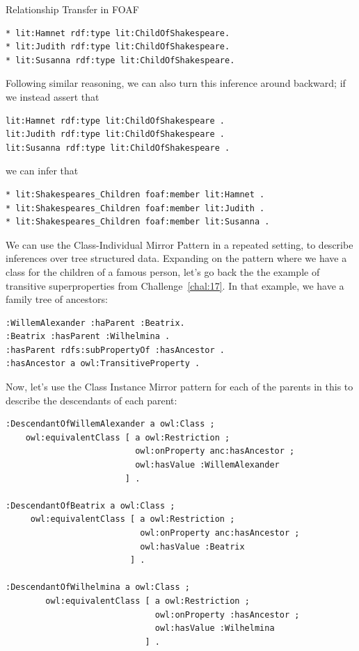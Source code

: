 \begin{challenge}{Relationship Transfer in FOAF}
\begin{lstlisting}
* lit:Hamnet rdf:type lit:ChildOfShakespeare.
* lit:Judith rdf:type lit:ChildOfShakespeare.
* lit:Susanna rdf:type lit:ChildOfShakespeare.
\end{lstlisting}

Following similar reasoning, we can also turn this inference around
backward; if we instead assert that

\begin{lstlisting}
lit:Hamnet rdf:type lit:ChildOfShakespeare .
lit:Judith rdf:type lit:ChildOfShakespeare .
lit:Susanna rdf:type lit:ChildOfShakespeare .
\end{lstlisting}

we can infer that

\begin{lstlisting}
* lit:Shakespeares_Children foaf:member lit:Hamnet .
* lit:Shakespeares_Children foaf:member lit:Judith .
* lit:Shakespeares_Children foaf:member lit:Susanna .
\end{lstlisting}

\end{challenge}



We can use the Class-Individual Mirror Pattern in a repeated setting, to 
describe inferences over tree structured data.  Expanding on the pattern 
where we have a class for the children of a famous person, let's go back 
the the example of transitive superproperties from Challenge~\ref{chal:17}.
In that example, we have a family tree of ancestors:

\begin{lstlisting}
:WillemAlexander :haParent :Beatrix.
:Beatrix :hasParent :Wilhelmina .
:hasParent rdfs:subPropertyOf :hasAncestor .
:hasAncestor a owl:TransitiveProperty . 
\end{lstlisting}

Now, let's use the Class Instance Mirror pattern for each of the parents in 
this to describe the descendants of each parent:

\begin{lstlisting}
:DescendantOfWillemAlexander a owl:Class ;
    owl:equivalentClass [ a owl:Restriction ;
                          owl:onProperty anc:hasAncestor ;
                          owl:hasValue :WillemAlexander
                        ] .

:DescendantOfBeatrix a owl:Class ;
     owl:equivalentClass [ a owl:Restriction ;
                           owl:onProperty anc:hasAncestor ;
                           owl:hasValue :Beatrix
                         ] .

:DescendantOfWilhelmina a owl:Class ;
        owl:equivalentClass [ a owl:Restriction ;
                              owl:onProperty :hasAncestor ;
                              owl:hasValue :Wilhelmina
                            ] .
\end{lstlisting}

